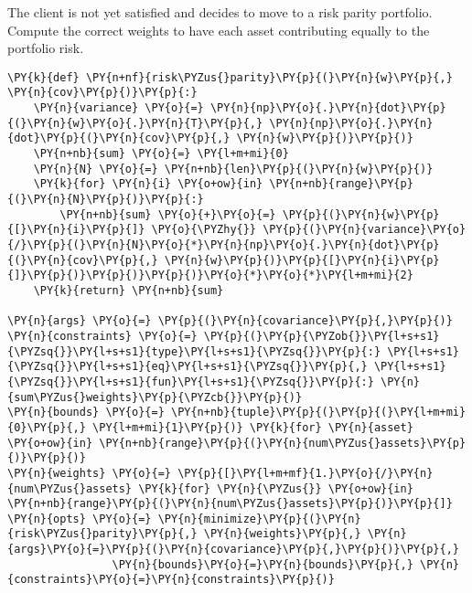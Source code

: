 \begin{Exercise}[title={(Risk Parity)}]
The client is not yet satisfied and decides to move to a risk parity portfolio.
Compute the correct weights to have each asset contributing equally to the portfolio risk.
\end{Exercise}
\begin{Answer}
\begin{tcolorbox}[size=fbox, boxrule=1pt, colback=cellbackground, colframe=cellborder]
\begin{Verbatim}[commandchars=\\\{\}]
\PY{k}{def} \PY{n+nf}{risk\PYZus{}parity}\PY{p}{(}\PY{n}{w}\PY{p}{,} \PY{n}{cov}\PY{p}{)}\PY{p}{:}
    \PY{n}{variance} \PY{o}{=} \PY{n}{np}\PY{o}{.}\PY{n}{dot}\PY{p}{(}\PY{n}{w}\PY{o}{.}\PY{n}{T}\PY{p}{,} \PY{n}{np}\PY{o}{.}\PY{n}{dot}\PY{p}{(}\PY{n}{cov}\PY{p}{,} \PY{n}{w}\PY{p}{)}\PY{p}{)} 
    \PY{n+nb}{sum} \PY{o}{=} \PY{l+m+mi}{0}
    \PY{n}{N} \PY{o}{=} \PY{n+nb}{len}\PY{p}{(}\PY{n}{w}\PY{p}{)}
    \PY{k}{for} \PY{n}{i} \PY{o+ow}{in} \PY{n+nb}{range}\PY{p}{(}\PY{n}{N}\PY{p}{)}\PY{p}{:}
        \PY{n+nb}{sum} \PY{o}{+}\PY{o}{=} \PY{p}{(}\PY{n}{w}\PY{p}{[}\PY{n}{i}\PY{p}{]} \PY{o}{\PYZhy{}} \PY{p}{(}\PY{n}{variance}\PY{o}{/}\PY{p}{(}\PY{n}{N}\PY{o}{*}\PY{n}{np}\PY{o}{.}\PY{n}{dot}\PY{p}{(}\PY{n}{cov}\PY{p}{,} \PY{n}{w}\PY{p}{)}\PY{p}{[}\PY{n}{i}\PY{p}{]}\PY{p}{)}\PY{p}{)}\PY{p}{)}\PY{o}{*}\PY{o}{*}\PY{l+m+mi}{2} 
    \PY{k}{return} \PY{n+nb}{sum}
		
\PY{n}{args} \PY{o}{=} \PY{p}{(}\PY{n}{covariance}\PY{p}{,}\PY{p}{)}
\PY{n}{constraints} \PY{o}{=} \PY{p}{(}\PY{p}{\PYZob{}}\PY{l+s+s1}{\PYZsq{}}\PY{l+s+s1}{type}\PY{l+s+s1}{\PYZsq{}}\PY{p}{:} \PY{l+s+s1}{\PYZsq{}}\PY{l+s+s1}{eq}\PY{l+s+s1}{\PYZsq{}}\PY{p}{,} \PY{l+s+s1}{\PYZsq{}}\PY{l+s+s1}{fun}\PY{l+s+s1}{\PYZsq{}}\PY{p}{:} \PY{n}{sum\PYZus{}weights}\PY{p}{\PYZcb{}}\PY{p}{)} 
\PY{n}{bounds} \PY{o}{=} \PY{n+nb}{tuple}\PY{p}{(}\PY{p}{(}\PY{l+m+mi}{0}\PY{p}{,} \PY{l+m+mi}{1}\PY{p}{)} \PY{k}{for} \PY{n}{asset} \PY{o+ow}{in} \PY{n+nb}{range}\PY{p}{(}\PY{n}{num\PYZus{}assets}\PY{p}{)}\PY{p}{)}
\PY{n}{weights} \PY{o}{=} \PY{p}{[}\PY{l+m+mf}{1.}\PY{o}{/}\PY{n}{num\PYZus{}assets} \PY{k}{for} \PY{n}{\PYZus{}} \PY{o+ow}{in} \PY{n+nb}{range}\PY{p}{(}\PY{n}{num\PYZus{}assets}\PY{p}{)}\PY{p}{]}
\PY{n}{opts} \PY{o}{=} \PY{n}{minimize}\PY{p}{(}\PY{n}{risk\PYZus{}parity}\PY{p}{,} \PY{n}{weights}\PY{p}{,} \PY{n}{args}\PY{o}{=}\PY{p}{(}\PY{n}{covariance}\PY{p}{,}\PY{p}{)}\PY{p}{,}
                \PY{n}{bounds}\PY{o}{=}\PY{n}{bounds}\PY{p}{,} \PY{n}{constraints}\PY{o}{=}\PY{n}{constraints}\PY{p}{)}


\end{Verbatim}
\end{tcolorbox}
\end{Answer}
